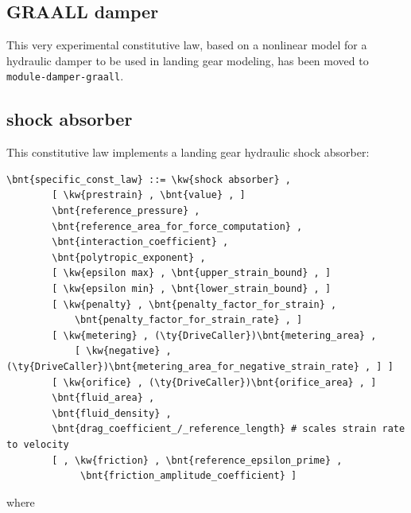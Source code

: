 \subsection{GRAALL damper}
This very experimental constitutive law, based on a nonlinear model
for a hydraulic damper to be used in landing gear modeling,
has been moved to \texttt{module-damper-graall}.

\subsection{shock absorber}\label{sec:CL:SHOCK-ABSORBER}
This constitutive law implements a landing gear hydraulic shock absorber:
\begin{Verbatim}[commandchars=\\\{\}]
    \bnt{specific_const_law} ::= \kw{shock absorber} ,
        [ \kw{prestrain} , \bnt{value} , ]
        \bnt{reference_pressure} ,
        \bnt{reference_area_for_force_computation} ,
        \bnt{interaction_coefficient} ,
        \bnt{polytropic_exponent} ,
        [ \kw{epsilon max} , \bnt{upper_strain_bound} , ]
        [ \kw{epsilon min} , \bnt{lower_strain_bound} , ]
        [ \kw{penalty} , \bnt{penalty_factor_for_strain} , 
            \bnt{penalty_factor_for_strain_rate} , ]
        [ \kw{metering} , (\ty{DriveCaller})\bnt{metering_area} ,
            [ \kw{negative} , (\ty{DriveCaller})\bnt{metering_area_for_negative_strain_rate} , ] ]
        [ \kw{orifice} , (\ty{DriveCaller})\bnt{orifice_area} , ]
        \bnt{fluid_area} ,
        \bnt{fluid_density} ,
        \bnt{drag_coefficient_/_reference_length} # scales strain rate to velocity
        [ , \kw{friction} , \bnt{reference_epsilon_prime} ,
             \bnt{friction_amplitude_coefficient} ]
\end{Verbatim}
where
